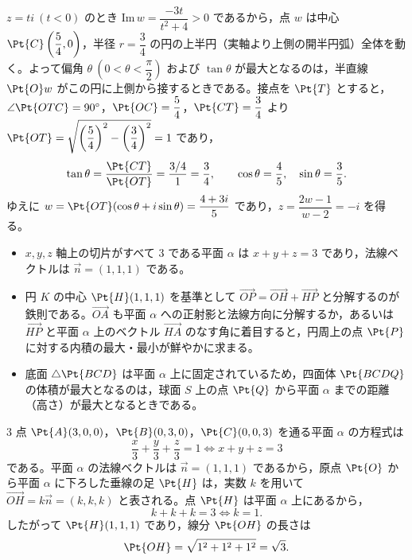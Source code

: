 \begin{betsu}[別解（原点から円への接線による幾何的解法）]
$z=ti\ (t<0)$ のとき $\mathrm{Im}\,w=\dfrac{-3t}{t^{2}+4}>0$ であるから，点 $w$ は中心 $\Pt{C}\left(\dfrac{5}{4}, 0\right)$，半径 $r=\dfrac{3}{4}$ の円の上半円（実軸より上側の開半円弧）全体を動く。よって偏角 $\theta\ \left(0<\theta<\dfrac{\pi}{2}\right)$ および $\tan\theta$ が最大となるのは，半直線 $\Pt{O}w$ がこの円に上側から接するときである。接点を $\Pt{T}$ とすると，$\angle\Pt{OTC}=90^{\circ}$，$\Pt{OC}=\dfrac{5}{4}$，$\Pt{CT}=\dfrac{3}{4}$ より $\Pt{OT}=\sqrt{\left(\dfrac{5}{4}\right)^{2}-\left(\dfrac{3}{4}\right)^{2}}=1$ であり，
\[
  \tan\theta = \frac{\Pt{CT}}{\Pt{OT}} = \frac{3/4}{1} = \frac{3}{4},\qquad
  \cos\theta = \frac{4}{5},\quad \sin\theta = \frac{3}{5}.
\]
ゆえに $w=\Pt{OT}(\cos\theta+i\sin\theta)=\dfrac{4+3i}{5}$ であり，$z=\dfrac{2w-1}{w-2}=-i$ を得る。
\end{betsu}



\begin{itemize}[leftmargin=1.6em,itemsep=2pt,topsep=2pt]
  \item[(1)] $x, y, z$ 軸上の切片がすべて $3$ である平面 $\alpha$ は $x+y+z=3$ であり，法線ベクトルは $\vec{n}=(1, 1, 1)$ である。
  \item[(2)] 円 $K$ の中心 $\Pt{H}(1, 1, 1)$ を基準として $\Vec{OP}=\Vec{OH}+\Vec{HP}$ と分解するのが鉄則である。$\Vec{OA}$ も平面 $\alpha$ への正射影と法線方向に分解するか，あるいは $\Vec{HP}$ と平面 $\alpha$ 上のベクトル $\Vec{HA}$ のなす角に着目すると，円周上の点 $\Pt{P}$ に対する内積の最大・最小が鮮やかに求まる。
  \item[(4)] 底面 $\triangle\Pt{BCD}$ は平面 $\alpha$ 上に固定されているため，四面体 $\Pt{BCDQ}$ の体積が最大となるのは，球面 $S$ 上の点 $\Pt{Q}$ から平面 $\alpha$ までの距離（高さ）が最大となるときである。
\end{itemize}

$3$ 点 $\Pt{A}(3,0,0)$，$\Pt{B}(0,3,0)$，$\Pt{C}(0,0,3)$ を通る平面 $\alpha$ の方程式は
\[
  \frac{x}{3}+\frac{y}{3}+\frac{z}{3}=1 \iff x+y+z=3
\]
である。平面 $\alpha$ の法線ベクトルは $\vec{n}=(1, 1, 1)$ であるから，原点 $\Pt{O}$ から平面 $\alpha$ に下ろした垂線の足 $\Pt{H}$ は，実数 $k$ を用いて $\Vec{OH}=k\vec{n}=(k, k, k)$ と表される。点 $\Pt{H}$ は平面 $\alpha$ 上にあるから，
\[
  k+k+k = 3 \iff k=1.
\]
したがって $\Pt{H}(1, 1, 1)$ であり，線分 $\Pt{OH}$ の長さは
\[
  \Pt{OH} = \sqrt{1^{2}+1^{2}+1^{2}} = \sqrt{3}.
\]

